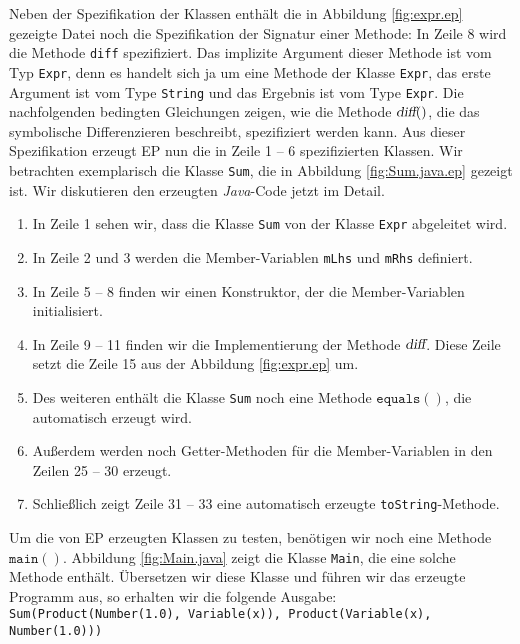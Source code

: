Neben der Spezifikation der Klassen enth\"alt die in Abbildung \ref{fig:expr.ep} gezeigte Datei noch
die Spezifikation der Signatur einer Methode: In Zeile 8 wird die Methode \texttt{diff}
spezifiziert.  Das implizite Argument dieser Methode ist vom Typ \texttt{Expr}, denn es handelt sich
ja um eine Methode der Klasse \texttt{Expr}, das erste Argument ist vom Type \texttt{String} und das Ergebnis
ist vom Type \texttt{Expr}.  Die nachfolgenden bedingten Gleichungen zeigen, wie die Methode
$\textsl{diff}()$, die das symbolische Differenzieren beschreibt, spezifiziert werden kann.   Aus
dieser Spezifikation erzeugt \textsc{EP} nun die in Zeile 1 -- 6 spezifizierten Klassen.  Wir
betrachten exemplarisch die Klasse \texttt{Sum}, die in Abbildung \ref{fig:Sum.java.ep} gezeigt ist.
Wir diskutieren den erzeugten \textsl{Java}-Code jetzt im Detail.
\begin{enumerate}
\item In Zeile 1 sehen wir, dass die Klasse \texttt{Sum} von der Klasse \texttt{Expr}
      abgeleitet wird.
\item In Zeile 2 und 3 werden die Member-Variablen \texttt{mLhs} und \texttt{mRhs} definiert.
\item In Zeile 5 -- 8 finden wir einen Konstruktor, der die Member-Variablen initialisiert.
\item In Zeile 9 -- 11 finden wir die Implementierung der Methode $\textsl{diff}$.  Diese Zeile
      setzt die Zeile 15 aus der Abbildung \ref{fig:expr.ep} um.
\item Des weiteren enth\"alt die Klasse \texttt{Sum} noch eine Methode $\texttt{equals}()$, die
      automatisch erzeugt wird.
\item Au{\ss}erdem werden noch Getter-Methoden f\"ur die Member-Variablen in den Zeilen 25 -- 30
      erzeugt.
\item Schlie{\ss}lich zeigt Zeile 31 -- 33 eine automatisch erzeugte \texttt{toString}-Methode.
\end{enumerate}
Um die von \textsc{EP} erzeugten Klassen zu testen, ben\"otigen wir noch eine Methode
$\texttt{main}()$.  Abbildung \ref{fig:Main.java} zeigt die Klasse \texttt{Main}, die eine
solche Methode enth\"alt.  \"Ubersetzen wir diese Klasse und f\"uhren wir das erzeugte Programm
aus, so erhalten wir die folgende Ausgabe:
\\[0.2cm]
\hspace*{1.3cm}
\texttt{Sum(Product(Number(1.0), Variable(x)), Product(Variable(x), Number(1.0)))}
\\[0.2cm]


